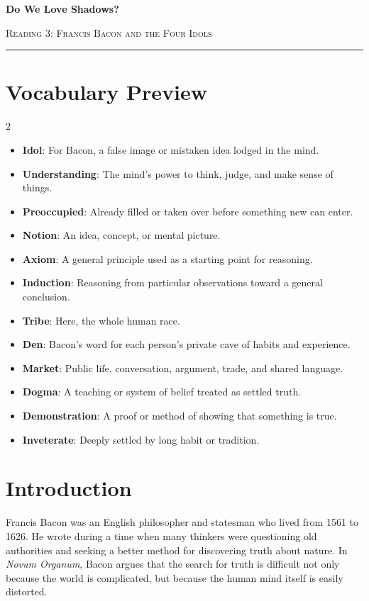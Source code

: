 \documentclass[12pt]{article}
\begin{document}
\begin{center}
{\LARGE\bfseries Do We Love Shadows?}\par\vspace{0.25em}
{\large\scshape Reading 3: Francis Bacon and the Four Idols}\par\vspace{0.45em}
\rule{0.82\textwidth}{0.4pt}\par\vspace{0.7em}
\end{center}

\section*{Vocabulary Preview}
\begin{multicols}{2}
\begin{itemize}[leftmargin=*, itemsep=0.18em]
\item \textbf{Idol}: For Bacon, a false image or mistaken idea lodged in the mind.
\item \textbf{Understanding}: The mind's power to think, judge, and make sense of things.
\item \textbf{Preoccupied}: Already filled or taken over before something new can enter.
\item \textbf{Notion}: An idea, concept, or mental picture.
\item \textbf{Axiom}: A general principle used as a starting point for reasoning.
\item \textbf{Induction}: Reasoning from particular observations toward a general conclusion.
\item \textbf{Tribe}: Here, the whole human race.
\item \textbf{Den}: Bacon's word for each person's private cave of habits and experience.
\item \textbf{Market}: Public life, conversation, argument, trade, and shared language.
\item \textbf{Dogma}: A teaching or system of belief treated as settled truth.
\item \textbf{Demonstration}: A proof or method of showing that something is true.
\item \textbf{Inveterate}: Deeply settled by long habit or tradition.
\end{itemize}
\end{multicols}

\section*{Introduction}
Francis Bacon was an English philosopher and statesman who lived from 1561 to 1626. He wrote during a time when many thinkers were questioning old authorities and seeking a better method for discovering truth about nature. In \textit{Novum Organum}, Bacon argues that the search for truth is difficult not only because the world is complicated, but because the human mind itself is easily distorted.
\end{document}
